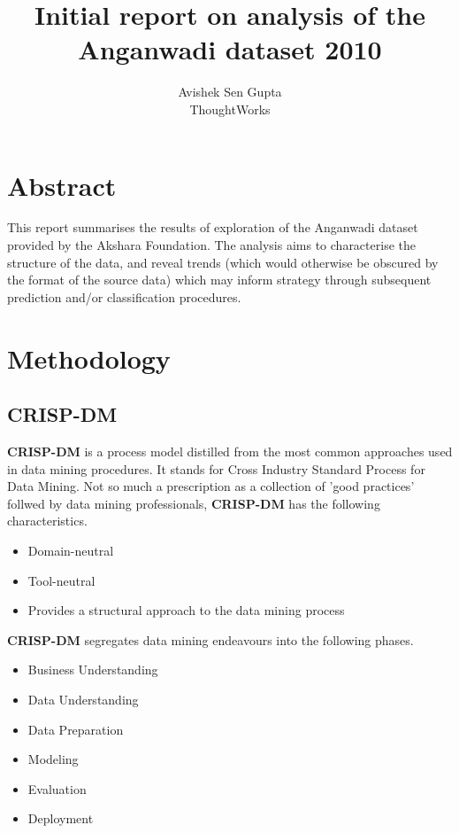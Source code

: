 \documentclass[10pt]{article}
\begin{document}
\title{Initial report on analysis of the Anganwadi dataset 2010} 
\author{Avishek Sen Gupta\\ThoughtWorks}
\maketitle
\newpage

\section{Abstract}
This report summarises the results of exploration of the Anganwadi dataset provided by the Akshara Foundation. The analysis aims to characterise the structure of the data, and reveal trends (which would otherwise be obscured by the format of the source data) which may inform strategy through subsequent prediction and/or classification procedures.

\newpage
\section{Methodology}
\subsection{CRISP-DM}
\textbf{CRISP-DM} is a process model distilled from the most common approaches used in data mining procedures. It stands for Cross Industry Standard Process for Data Mining. Not so much a prescription as a collection of 'good practices' follwed by data mining professionals, \textbf{CRISP-DM} has the following characteristics.

\begin{itemize}
\item Domain-neutral
\item Tool-neutral
\item Provides a structural approach to the data mining process
\end{itemize}

\textbf{CRISP-DM} segregates data mining endeavours into the following phases.

\begin{itemize}
\item Business Understanding
\item Data Understanding
\item Data Preparation
\item Modeling
\item Evaluation
\item Deployment
\end{itemize}
\end{document}
